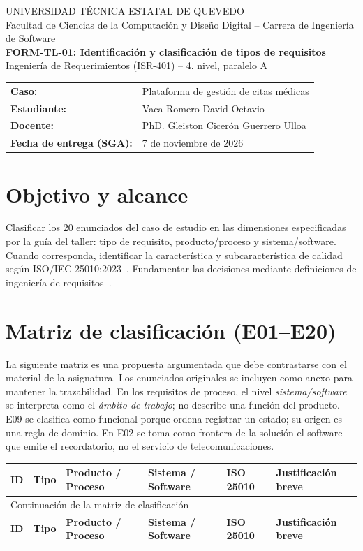 \documentclass[11pt,a4paper]{article}
\begin{document}
\begin{center}
{\small UNIVERSIDAD TÉCNICA ESTATAL DE QUEVEDO}\\
{\small Facultad de Ciencias de la Computación y Diseño Digital -- Carrera de Ingeniería de Software}\\[5pt]
{\Large\bfseries FORM-TL-01: Identificación y clasificación de tipos de requisitos}\\[3pt]
{\normalsize Ingeniería de Requerimientos (ISR-401) -- 4.\textordmasculine{} nivel, paralelo A}
\end{center}
\begin{tabularx}{\textwidth}{@{}>{\bfseries}lX@{}}
Caso: & Plataforma de gestión de citas médicas\\
Estudiante: & Vaca Romero David Octavio\\
Docente: & PhD. Gleiston Cicerón Guerrero Ulloa\\
Fecha de entrega (SGA): & 7 de noviembre de 2026\\
\end{tabularx}

\section{Objetivo y alcance}
Clasificar los 20 enunciados del caso de estudio en las dimensiones especificadas por la guía del taller: tipo de requisito, producto/proceso y sistema/software. Cuando corresponda, identificar la característica y subcaracterística de calidad según ISO/IEC 25010:2023~\cite{iso25010}. Fundamentar las decisiones mediante definiciones de ingeniería de requisitos~\cite{iso29148}.

\section{Matriz de clasificación (E01--E20)}
La siguiente matriz es una propuesta argumentada que debe contrastarse con el material de la asignatura. Los enunciados originales se incluyen como anexo para mantener la trazabilidad. En los requisitos de proceso, el nivel \emph{sistema/software} se interpreta como el \emph{ámbito de trabajo}; no describe una función del producto. E09 se clasifica como funcional porque ordena registrar un estado; su origen es una regla de dominio. En E02 se toma como frontera de la solución el software que emite el recordatorio, no el servicio de telecomunicaciones.

{\footnotesize
\begin{longtable}{|p{0.9cm}|p{1.9cm}|p{1.7cm}|p{1.6cm}|p{2.7cm}|p{5.2cm}|}
\hline
\textbf{ID} & \textbf{Tipo} & \textbf{Producto / Proceso} & \textbf{Sistema / Software} & \textbf{ISO 25010} & \textbf{Justificación breve}\\ \hline
\endfirsthead
\multicolumn{6}{l}{\small Continuación de la matriz de clasificación}\\
\hline
\textbf{ID} & \textbf{Tipo} & \textbf{Producto / Proceso} & \textbf{Sistema / Software} & \textbf{ISO 25010} & \textbf{Justificación breve}\\ \hline
\endhead

\end{longtable}
}
\end{document}
